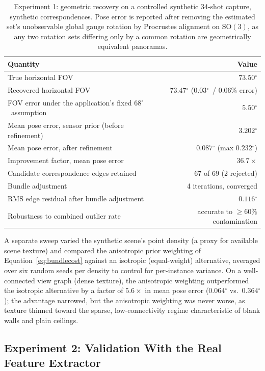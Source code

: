 \documentclass[11pt]{article}
\newcommand{\SO}{\mathrm{SO}(3)}
\newcommand{\Deg}{\ensuremath{^{\circ}}}
\begin{document}
\begin{table}[h]
\centering
\small
\begin{tabular}{@{}lr@{}}
\toprule
\textbf{Quantity} & \textbf{Value} \\
\midrule
True horizontal FOV & $73.50\Deg$ \\
Recovered horizontal FOV & $73.47\Deg$ (0.03\Deg\ / 0.06\% error) \\
FOV error under the application's fixed 68\Deg\ assumption & $5.50\Deg$ \\
Mean pose error, sensor prior (before refinement) & $3.202\Deg$ \\
Mean pose error, after refinement & $0.087\Deg$ (max $0.232\Deg$) \\
Improvement factor, mean pose error & $36.7\times$ \\
Candidate correspondence edges retained & 67 of 69 (2 rejected) \\
Bundle adjustment & 4 iterations, converged \\
RMS edge residual after bundle adjustment & $0.116\Deg$ \\
Robustness to combined outlier rate & accurate to $\ge 60\%$ contamination \\
\bottomrule
\end{tabular}
\caption{Experiment 1: geometric recovery on a controlled synthetic 34-shot capture, synthetic correspondences. Pose error is reported after removing the estimated set's unobservable global gauge rotation by Procrustes alignment on $\SO$, as any two rotation sets differing only by a common rotation are geometrically equivalent panoramas.}
\label{tab:exp1}
\end{table}

A separate sweep varied the synthetic scene's point density (a proxy for available scene texture) and compared the anisotropic prior weighting of Equation~\eqref{eq:bundlecost} against an isotropic (equal-weight) alternative, averaged over six random seeds per density to control for per-instance variance. On a well-connected view graph (dense texture), the anisotropic weighting outperformed the isotropic alternative by a factor of $5.6\times$ in mean pose error ($0.064\Deg$ vs.\ $0.364\Deg$); the advantage narrowed, but the anisotropic weighting was never worse, as texture thinned toward the sparse, low-connectivity regime characteristic of blank walls and plain ceilings.

\subsection{Experiment 2: Validation With the Real Feature Extractor}
\label{sec:eval2}
\end{document}
